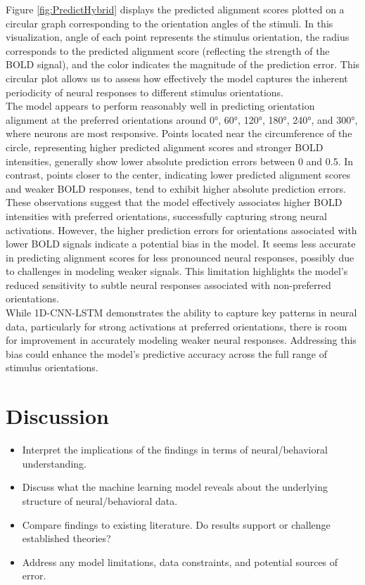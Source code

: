 \documentclass[a4paper]{article}
\begin{document}
\noindent Figure \ref{fig:PredictHybrid} displays the predicted alignment scores plotted on a circular graph corresponding to the orientation angles of the stimuli. In this visualization, angle of each point represents the stimulus orientation, the radius corresponds to the predicted alignment score (reflecting the strength of the BOLD signal), and the color indicates the magnitude of the prediction error. This circular plot allows us to assess how effectively the model captures the inherent periodicity of neural responses to different stimulus orientations.\\

\noindent The model appears to perform reasonably well in predicting orientation alignment at the preferred orientations around 0°, 60°, 120°, 180°, 240°, and 300°, where neurons are most responsive. Points located near the circumference of the circle, representing higher predicted alignment scores and stronger BOLD intensities, generally show lower absolute prediction errors between 0 and 0.5. In contrast, points closer to the center, indicating lower predicted alignment scores and weaker BOLD responses, tend to exhibit higher absolute prediction errors. These observations suggest that the model effectively associates higher BOLD intensities with preferred orientations, successfully capturing strong neural activations. However, the higher prediction errors for orientations associated with lower BOLD signals indicate a potential bias in the model. It seems less accurate in predicting alignment scores for less pronounced neural responses, possibly due to challenges in modeling weaker signals. This limitation highlights the model's reduced sensitivity to subtle neural responses associated with non-preferred orientations.\\

\noindent While 1D-CNN-LSTM demonstrates the ability to capture key patterns in neural data, particularly for strong activations at preferred orientations, there is room for improvement in accurately modeling weaker neural responses. Addressing this bias could enhance the model's predictive accuracy across the full range of stimulus orientations.

\section{Discussion}
\label{sec:discussion}
    \begin{itemize}
        \item Interpret the implications of the findings in terms of neural/behavioral understanding.
        \item Discuss what the machine learning model reveals about the underlying structure of neural/behavioral data.
        \item Compare findings to existing literature. Do results support or challenge established theories?
        \item Address any model limitations, data constraints, and potential sources of error.
    \end{itemize}
    
\end{document}
